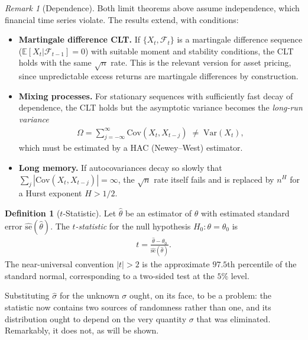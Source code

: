 \documentclass[11pt]{article}
\theoremstyle{definition}
\newtheorem{definition}{Definition}[section]
\theoremstyle{plain}
\theoremstyle{remark}
\newtheorem{remark}{Remark}[section]
\begin{document}
\begin{remark}[Dependence]
    Both limit theorems above assume independence, which financial time series violate. The results extend, with conditions:
    \begin{itemize}[noitemsep]
        \item \textbf{Martingale difference CLT.} If $\{X_t,\mathcal{F}_t\}$ is a martingale difference sequence ($\mathbb{E}[X_t|\mathcal{F}_{t-1}]=0$) with suitable moment and stability conditions, the CLT holds with the same $\sqrt{n}$ rate. This is the relevant version for asset pricing, since unpredictable excess returns are martingale differences by construction.
        \item \textbf{Mixing processes.} For stationary sequences with sufficiently fast decay of dependence, the CLT holds but the asymptotic variance becomes the \emph{long-run variance}
        \begin{align}
            \Omega = \sum_{j=-\infty}^{\infty} \mathrm{Cov}(X_t, X_{t-j}) \;\neq\; \mathrm{Var}(X_t),
        \end{align}
        which must be estimated by a HAC (Newey--West) estimator.
        \item \textbf{Long memory.} If autocovariances decay so slowly that $\sum_j |\mathrm{Cov}(X_t,X_{t-j})| = \infty$, the $\sqrt{n}$ rate itself fails and is replaced by $n^{H}$ for a Hurst exponent $H > 1/2$.
    \end{itemize}
\end{remark}


\begin{definition}[$t$-Statistic]
    Let $\hat{\theta}$ be an estimator of $\theta$ with estimated standard error $\widehat{\mathrm{se}}(\hat{\theta})$. The \emph{$t$-statistic} for the null hypothesis $H_0 : \theta = \theta_0$ is
    \begin{align}
        t = \frac{\hat{\theta} - \theta_0}{\widehat{\mathrm{se}}(\hat{\theta})}.
    \end{align}
    The near-universal convention $|t| > 2$ is the approximate $97.5$th percentile of the standard normal, corresponding to a two-sided test at the $5\%$ level.
\end{definition}

Substituting $\hat{\sigma}$ for the unknown $\sigma$ ought, on its face, to be a problem: the statistic now contains two sources of randomness rather than one, and its distribution ought to depend on the very quantity $\sigma$ that was eliminated. Remarkably, it does not, as will be shown.
\end{document}
